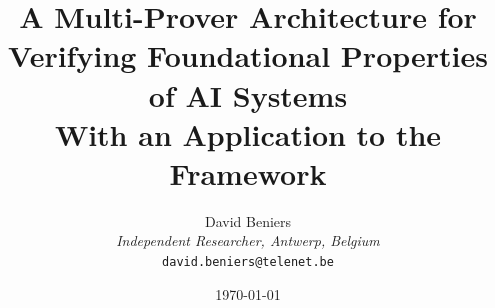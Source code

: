 \documentclass[11pt,a4paper]{article}
\title{\huge \textbf{A Multi-Prover Architecture for Verifying Foundational Properties of AI Systems} \\
\large With an Application to the \Apeiron{} Framework}
\author{
    David Beniers \\
    \small \textit{Independent Researcher, Antwerp, Belgium} \\
    \small \texttt{david.beniers@telenet.be}
}
\date{\today}
\begin{document}
\maketitle


\tableofcontents
\newpage


\FloatBarrier

\FloatBarrier

\FloatBarrier

\FloatBarrier

\FloatBarrier

\FloatBarrier

\FloatBarrier

\printbibliography
\end{document}
